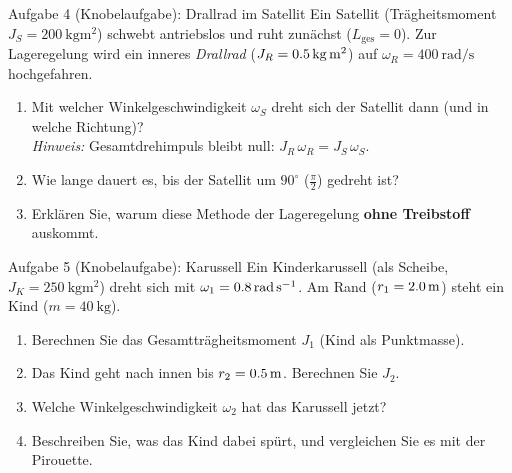 \documentclass[11pt,a4paper,parskip=half]{scrartcl}
\begin{document}
\begin{sternbox}{Aufgabe 4 (Knobelaufgabe): Drallrad im Satellit}
Ein Satellit (Tr\"agheitsmoment $J_S = \SI{200}{\kilogram\metre\squared}$) schwebt
antriebslos und ruht zun\"achst ($L_{\text{ges}} = 0$). Zur Lageregelung wird ein
inneres \emph{Drallrad} ($J_R = \SI{0{,}5}{\kilogram\metre\squared}$) auf
$\omega_R = \SI{400}{\radian\per\second}$ hochgefahren.

\begin{enumerate}[label=\alph*), leftmargin=1.5em, itemsep=1pt]
  \item Mit welcher Winkelgeschwindigkeit $\omega_S$ dreht sich der Satellit dann
        (und in welche Richtung)?\\
        \textit{Hinweis:} Gesamtdrehimpuls bleibt null: $J_R\,\omega_R = J_S\,\omega_S$.
  \item Wie lange dauert es, bis der Satellit um $90^\circ$ ($\tfrac{\pi}{2}$) gedreht ist?
  \item Erkl\"aren Sie, warum diese Methode der Lageregelung \textbf{ohne Treibstoff} auskommt.
\end{enumerate}
\end{sternbox}

\vspace{16pt}

\begin{sternbox}{Aufgabe 5 (Knobelaufgabe): Karussell}
Ein Kinderkarussell (als Scheibe, $J_K = \SI{250}{\kilogram\metre\squared}$)
dreht sich mit $\omega_1 = \SI{0{,}8}{\radian\per\second}$. Am Rand
($r_1 = \SI{2{,}0}{\metre}$) steht ein Kind ($m = \SI{40}{\kilogram}$).

\begin{enumerate}[label=\alph*), leftmargin=1.5em, itemsep=1pt]
  \item Berechnen Sie das Gesamttr\"agheitsmoment $J_1$ (Kind als Punktmasse).
  \item Das Kind geht nach innen bis $r_2 = \SI{0{,}5}{\metre}$. Berechnen Sie $J_2$.
  \item Welche Winkelgeschwindigkeit $\omega_2$ hat das Karussell jetzt?
  \item Beschreiben Sie, was das Kind dabei sp\"urt, und vergleichen Sie es mit der Pirouette.
\end{enumerate}
\end{sternbox}

\vspace{16pt}
\end{document}

